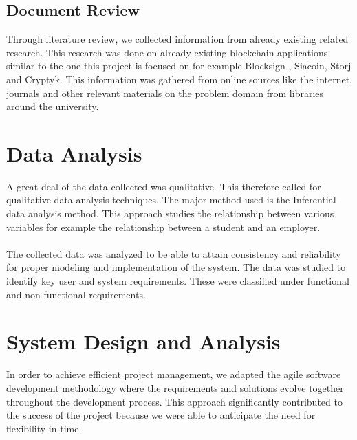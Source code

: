 \subsection{Document Review}
Through literature review, we collected information from already existing related research. This research was done on already existing blockchain applications similar to the one this project is focused on for example Blocksign \cite{art14}, Siacoin\cite{art15}, Storj\cite{art16} and Cryptyk\cite{art18}. This information was gathered from online sources like the internet, journals and other relevant materials on the problem domain from libraries around the university.


\section{Data Analysis}
A great deal of the data collected was qualitative. This therefore called for qualitative data analysis techniques. The major method used is the Inferential data analysis method. This approach studies the relationship between various variables for example the relationship between a student and an employer.\\~\\
The collected data was analyzed to be able to attain consistency and reliability for proper modeling and implementation of the system. The data was studied to identify key user and system requirements. These were classified under functional and non-functional requirements.

\section{System Design and Analysis}
In order to achieve efficient project management, we adapted the agile software development methodology where the requirements and solutions evolve together throughout the development process. This approach significantly contributed to the success of the project because we were able to anticipate the need for flexibility in time. 

